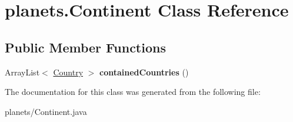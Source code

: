 \hypertarget{classplanets_1_1_continent}{}\section{planets.\+Continent Class Reference}
\label{classplanets_1_1_continent}
\subsection*{Public Member Functions}
\begin{DoxyCompactItemize}
\item 
Array\+List$<$ \hyperlink{classplanets_1_1_country}{Country} $>$ {\bfseries contained\+Countries} ()\hypertarget{classplanets_1_1_continent_a46392390af0529125f6ec5857e5c0e68}{}\label{classplanets_1_1_continent_a46392390af0529125f6ec5857e5c0e68}

\end{DoxyCompactItemize}


The documentation for this class was generated from the following file\+:\begin{DoxyCompactItemize}
\item 
planets/Continent.\+java\end{DoxyCompactItemize}
